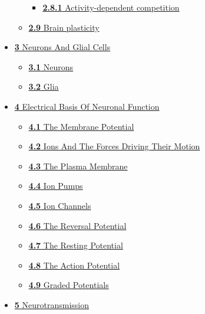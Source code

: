 \begin{itemize}
\begin{itemize}
    \begin{itemize}
    \tightlist
    \item
      \href{development-of-the-nervous-system-1.html\#activity-dependent-competition}{\emph{}\textbf{2.8.1}
      Activity-dependent competition}
    \end{itemize}
  \item
    \href{development-of-the-nervous-system-1.html\#brain-plasticity}{\emph{}\textbf{2.9}
    Brain plasticity}
  \end{itemize}
\item
  \href{neurons-and-glial-cells.html}{\emph{}\textbf{3} Neurons And
  Glial Cells}

  \begin{itemize}
  \tightlist
  \item
    \href{neurons-and-glial-cells.html\#neurons}{\emph{}\textbf{3.1}
    Neurons}
  \item
    \href{neurons-and-glial-cells.html\#glia}{\emph{}\textbf{3.2} Glia}
  \end{itemize}
\item
  \href{electrical-basis-of-neuronal-function.html}{\emph{}\textbf{4}
  Electrical Basis Of Neuronal Function}

  \begin{itemize}
  \tightlist
  \item
    \href{electrical-basis-of-neuronal-function.html\#the-membrane-potential}{\emph{}\textbf{4.1}
    The Membrane Potential}
  \item
    \href{electrical-basis-of-neuronal-function.html\#ions-and-the-forces-driving-their-motion}{\emph{}\textbf{4.2}
    Ions And The Forces Driving Their Motion}
  \item
    \href{electrical-basis-of-neuronal-function.html\#the-plasma-membrane}{\emph{}\textbf{4.3}
    The Plasma Membrane}
  \item
    \href{electrical-basis-of-neuronal-function.html\#ion-pumps}{\emph{}\textbf{4.4}
    Ion Pumps}
  \item
    \href{electrical-basis-of-neuronal-function.html\#ion-channels}{\emph{}\textbf{4.5}
    Ion Channels}
  \item
    \href{electrical-basis-of-neuronal-function.html\#the-reversal-potential}{\emph{}\textbf{4.6}
    The Reversal Potential}
  \item
    \href{electrical-basis-of-neuronal-function.html\#the-resting-potential}{\emph{}\textbf{4.7}
    The Resting Potential}
  \item
    \href{electrical-basis-of-neuronal-function.html\#the-action-potential}{\emph{}\textbf{4.8}
    The Action Potential}
  \item
    \href{electrical-basis-of-neuronal-function.html\#graded-potentials}{\emph{}\textbf{4.9}
    Graded Potentials}
  \end{itemize}
\item
  \href{neurotransmission.html}{\emph{}\textbf{5} Neurotransmission}


\end{itemize}

